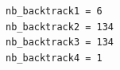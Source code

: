 \begin{verbatim}
nb_backtrack1 = 6
nb_backtrack2 = 134
nb_backtrack3 = 134
nb_backtrack4 = 1
\end{verbatim}
